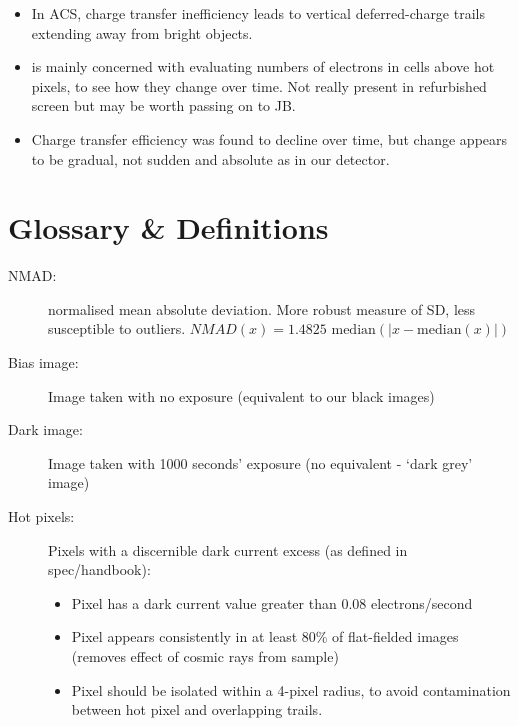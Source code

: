 \documentclass[10pt,fleqn]{article}
\begin{document}
\begin{itemize}

\item In ACS, charge transfer inefficiency leads to vertical deferred-charge trails extending away from bright objects. 

\item \cite{CTEevolution2012} is mainly concerned with evaluating numbers of electrons in cells above hot pixels, to see how they change over time. Not really present in refurbished screen but may be worth passing on to JB.

\item Charge transfer efficiency was found to decline over time, but change appears to be gradual, not sudden and absolute as in our detector.
\end{itemize}

\section{Glossary \& Definitions}

\begin{description}

\item[NMAD: ] normalised mean absolute deviation. More robust measure of SD, less susceptible to outliers. $NMAD(x) = 1.4825  \text{ median} \left( |x - \text{median} (x)| \right)$ 

\item[Bias image: ] Image taken with no exposure (equivalent to our black images)

\item[Dark image: ] Image taken with 1000 seconds' exposure (no equivalent - `dark grey' image)

\item[Hot pixels: ] Pixels with a discernible dark current excess (as defined in spec/handbook):
\begin{itemize}
\item Pixel has a dark current value greater than 0.08 electrons/second
\item Pixel appears consistently in at least 80\% of flat-fielded images (removes effect of cosmic rays from sample)
\item Pixel should be isolated within a 4-pixel radius, to avoid contamination between hot pixel and overlapping trails.
\end{itemize}
\end{description}

\hrulefill
\printbibliography
\end{document}
